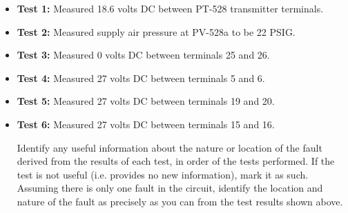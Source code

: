 \begin{itemize}
\item{} {\bf Test 1:} Measured 18.6 volts DC between PT-528 transmitter terminals.
\vskip 25pt
\item{} {\bf Test 2:} Measured supply air pressure at PV-528a to be 22 PSIG.
\vskip 25pt
\item{} {\bf Test 3:} Measured 0 volts DC between terminals 25 and 26.
\vskip 25pt
\item{} {\bf Test 4:} Measured 27 volts DC between terminals 5 and 6.
\vskip 25pt
\item{} {\bf Test 5:} Measured 27 volts DC between terminals 19 and 20.
\vskip 25pt
\item{} {\bf Test 6:} Measured 27 volts DC between terminals 15 and 16.
\vskip 25pt
\medskip

Identify any useful information about the nature or location of the fault derived from the results of each test, in order of the tests performed.  If the test is not useful (i.e. provides no new information), mark it as such.  Assuming there is only one fault in the circuit, identify the location and nature of the fault as precisely as you can from the test results shown above.

\vfil 

\eject







\end{itemize}
